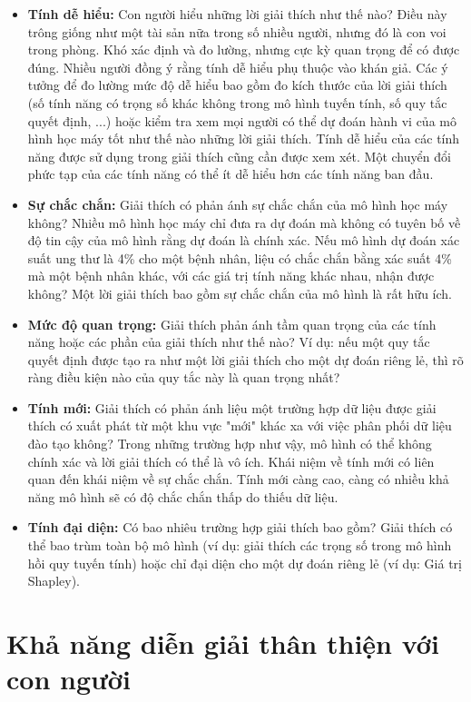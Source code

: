 \begin{itemize}
    \item \textbf{Tính dễ hiểu:} Con người hiểu những lời giải thích như thế nào? Điều này trông giống như một tài sản nữa trong số nhiều người, nhưng đó là con voi trong phòng. Khó xác định và đo lường, nhưng cực kỳ quan trọng để có được đúng. Nhiều người đồng ý rằng tính dễ hiểu phụ thuộc vào khán giả. Các ý tưởng để đo lường mức độ dễ hiểu bao gồm đo kích thước của lời giải thích (số tính năng có trọng số khác không trong mô hình tuyến tính, số quy tắc quyết định, ...) hoặc kiểm tra xem mọi người có thể dự đoán hành vi của mô hình học máy tốt như thế nào những lời giải thích. Tính dễ hiểu của các tính năng được sử dụng trong giải thích cũng cần được xem xét. Một chuyển đổi phức tạp của các tính năng có thể ít dễ hiểu hơn các tính năng ban đầu.
    \item \textbf{Sự chắc chắn:} Giải thích có phản ánh sự chắc chắn của mô hình học máy không? Nhiều mô hình học máy chỉ đưa ra dự đoán mà không có tuyên bố về độ tin cậy của mô hình rằng dự đoán là chính xác. Nếu mô hình dự đoán xác suất ung thư là 4\% cho một bệnh nhân, liệu có chắc chắn bằng xác suất 4\% mà một bệnh nhân khác, với các giá trị tính năng khác nhau, nhận được không? Một lời giải thích bao gồm sự chắc chắn của mô hình là rất hữu ích.
    \item \textbf{Mức độ quan trọng:} Giải thích phản ánh tầm quan trọng của các tính năng hoặc các phần của giải thích như thế nào? Ví dụ: nếu một quy tắc quyết định được tạo ra như một lời giải thích cho một dự đoán riêng lẻ, thì rõ ràng điều kiện nào của quy tắc này là quan trọng nhất?
    \item \textbf{Tính mới:} Giải thích có phản ánh liệu một trường hợp dữ liệu được giải thích có xuất phát từ một khu vực "mới" khác xa với việc phân phối dữ liệu đào tạo không? Trong những trường hợp như vậy, mô hình có thể không chính xác và lời giải thích có thể là vô ích. Khái niệm về tính mới có liên quan đến khái niệm về sự chắc chắn. Tính mới càng cao, càng có nhiều khả năng mô hình sẽ có độ chắc chắn thấp do thiếu dữ liệu.
    \item \textbf{Tính đại diện:} Có bao nhiêu trường hợp giải thích bao gồm? Giải thích có thể bao trùm toàn bộ mô hình (ví dụ: giải thích các trọng số trong mô hình hồi quy tuyến tính) hoặc chỉ đại diện cho một dự đoán riêng lẻ (ví dụ: Giá trị Shapley).
\end{itemize}

\clearpage

\section{Khả năng diễn giải thân thiện với con người}

